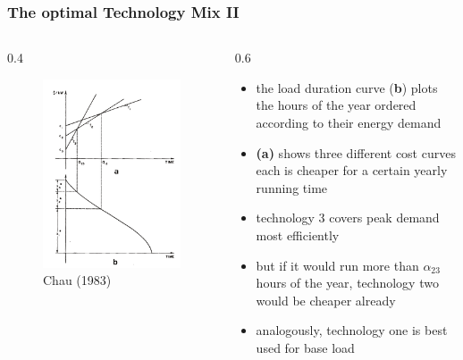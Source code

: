 \begin{frame}

\frametitle{The optimal Technology Mix II}
\begin{columns}
\begin{column} {0.4\textwidth}

\begin{figure}[h]
\centering
\includegraphics[width=1.\textwidth]{capacity/technology_choice_sherali}
    \caption{Chau (1983)}
    \label{fig:Daten 2004}            
\end{figure}
\end{column}

\begin{column} {0.6\textwidth}
\begin{itemize}
\item the load duration curve (\textbf{b}) plots the hours of the year ordered according to their energy demand
\item \textbf{(a)} shows three different cost curves each is cheaper for a certain yearly running time
\item technology 3 covers peak demand most efficiently 
\item but if it would run more than $\alpha_{23}$ hours of the year, technology two would be cheaper already
\item analogously, technology one is best used for base load
\end {itemize}

\end{column}
\end{columns}

\end{frame}	
